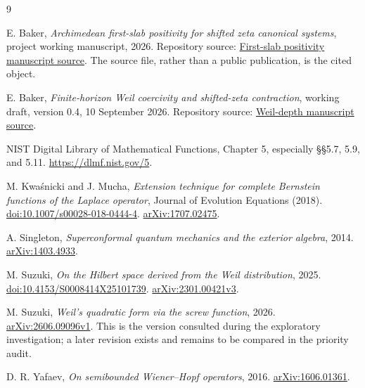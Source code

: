 \documentclass[11pt]{article}
\numberwithin{equation}{section}
\theoremstyle{definition}
\theoremstyle{remark}
\begin{document}
\begin{thebibliography}{9}
\raggedright

E. Baker, \emph{Archimedean first-slab positivity for shifted zeta canonical systems}, project working
manuscript, 2026. Repository source:
\href{../../../shifted-zeta/first-slab-positivity/first_slab_positivity.tex}{First-slab positivity manuscript source}.
The source file, rather than a public publication, is the cited object.

E. Baker, \emph{Finite-horizon Weil coercivity and shifted-zeta contraction},
working draft, version 0.4, 10 September 2026. Repository source:
\href{../../../shifted-zeta/weil-depth/manuscript/finite_horizon_weil.tex}{Weil-depth manuscript source}.

NIST Digital Library of Mathematical Functions, Chapter 5,
especially \S\S5.7, 5.9, and 5.11.
\url{https://dlmf.nist.gov/5}.

M. Kwa\'snicki and J. Mucha,
\emph{Extension technique for complete Bernstein functions of the Laplace
operator}, Journal of Evolution Equations (2018).
\href{https://doi.org/10.1007/s00028-018-0444-4}{doi:10.1007/s00028-018-0444-4}.
\href{https://arxiv.org/abs/1707.02475}{arXiv:1707.02475}.

A. Singleton, \emph{Superconformal quantum mechanics and the exterior
algebra}, 2014. \href{https://arxiv.org/abs/1403.4933}{arXiv:1403.4933}.

M. Suzuki, \emph{On the Hilbert space derived from the Weil distribution},
2025. \href{https://doi.org/10.4153/S0008414X25101739}{doi:10.4153/S0008414X25101739}.
\href{https://arxiv.org/abs/2301.00421v3}{arXiv:2301.00421v3}.

M. Suzuki, \emph{Weil's quadratic form via the screw function}, 2026.
\href{https://arxiv.org/abs/2606.09096v1}{arXiv:2606.09096v1}.
This is the version consulted during the exploratory investigation;
a later revision exists and remains to be compared in the priority audit.

D. R. Yafaev, \emph{On semibounded Wiener--Hopf operators}, 2016.
\href{https://arxiv.org/abs/1606.01361}{arXiv:1606.01361}.

\end{thebibliography}
\end{document}

